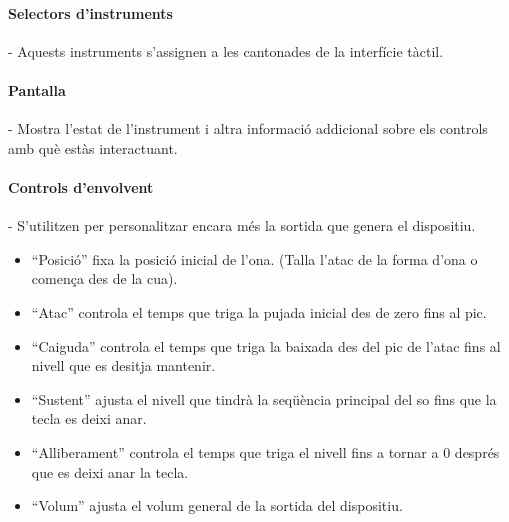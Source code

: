 \begin{figure}[h]
\centering \small
{}
\vspace{-2em}
\end{figure}

\paragraph{Selectors d'instruments} - Aquests instruments s'assignen a les cantonades de la interfície tàctil.

\paragraph{Pantalla} - Mostra l'estat de l'instrument i altra informació addicional sobre els controls amb què estàs interactuant.

\paragraph{Controls d'envolvent} - S'utilitzen per personalitzar encara més la sortida que genera el dispositiu.
\begin{itemize}
\item ``Posició'' fixa la posició inicial de l'ona. (Talla l'atac de la forma d'ona o comença des de la cua).
\item ``Atac'' controla el temps que triga la pujada inicial des de zero fins al pic.
\item ``Caiguda'' controla el temps que triga la baixada des del pic de l'atac fins al nivell que es desitja mantenir.
\item ``Sustent'' ajusta el nivell que tindrà la seqüència principal del so fins que la tecla es deixi anar.
\item ``Alliberament'' controla el temps que triga el nivell fins a tornar a 0 després que es deixi anar la tecla.
\item ``Volum''  ajusta el volum general de la sortida del dispositiu.
\end{itemize}

